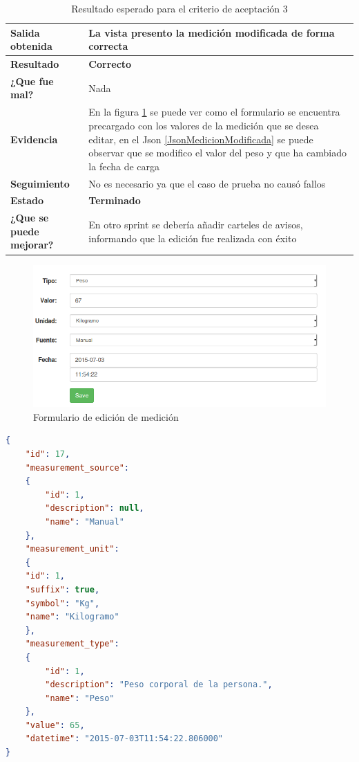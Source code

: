             {\scriptsize
	\begin{table}[h]
	\centering
	\begin{tabular}{|l|p{10cm}|}
	    \hline 
	    \textbf{Salida obtenida}& La vista presento la medición modificada de forma correcta\\ \hline
	    \textbf{Resultado}& \textbf{Correcto}\\ \hline
        \textbf{¿Que fue mal?}& Nada\\ \hline      
        \textbf{Evidencia}&  En la figura \ref{edicion_medicion} se puede ver como el formulario se encuentra precargado con los valores de la medición que se desea editar, en el Json \ref{JsonMedicionModificada} se puede observar que se modifico el valor del peso y que ha cambiado la fecha de carga \\ \hline
        \textbf{Seguimiento}& No es necesario ya que el caso de prueba no causó
fallos\\ \hline
        \textbf{Estado}& \textbf{Terminado}\\ \hline        
        \textbf{¿Que se puede mejorar?}& En otro sprint se debería añadir carteles de avisos, informando que la edición fue realizada con éxito \\ \hline              
	    \end{tabular}
        \caption{Resultado esperado para el criterio de aceptación 3}
    	\end{table}
	}
\begin{figure}[h]
        \centering
        \includegraphics[width=1\textwidth]{img/2-prueba_3}
        \caption{Formulario de edición de medición}
		\label{edicion_medicion}
\end{figure}

\begin{lstlisting}[language=json,firstnumber=1,  breaklines=true, caption= Json de las medicion modificada del perfil id:3, label=JsonMedicionModificada]
{
	"id": 17,
    "measurement_source": 
	{
    	"id": 1,
	    "description": null,
	    "name": "Manual"
	},
	"measurement_unit": 
	{
    "id": 1,
    "suffix": true,
    "symbol": "Kg",
    "name": "Kilogramo"
	},
	"measurement_type": 
    {
        "id": 1,
        "description": "Peso corporal de la persona.",
        "name": "Peso"
    },
    "value": 65,
    "datetime": "2015-07-03T11:54:22.806000"
}
\end{lstlisting}
\clearpage  

